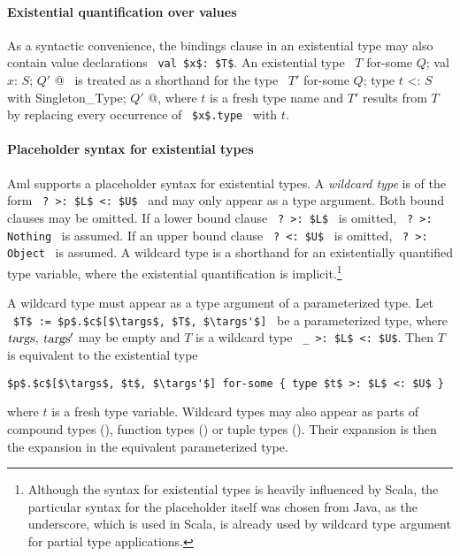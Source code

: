 \paragraph{Existential quantification over values}
As a syntactic convenience, the bindings clause in an existential type may also contain value declarations ~\lstinline!val $x$: $T$!. An existential type ~\lstinline@$T$ for-some { $Q$; val $x$: $S$; $Q'$ }@~ is treated as a shorthand for the type ~\lstinline@$T'$ for-some { $Q$; type $t$ <: $S$ with Singleton_Type; $Q'$ }@, where $t$ is a fresh type name and $T'$ results from $T$ by replacing every occurrence of ~\lstinline!$x$.type!~ with $t$. 



\paragraph{Placeholder syntax for existential types}
\label{par:placeholder-existential-types}
Aml supports a placeholder syntax for existential types. A {\em wildcard type} is of the form ~\lstinline!? >: $L$ <: $U$!~ and may only appear as a type argument. Both bound clauses may be omitted. If a lower bound clause ~\lstinline!? >: $L$!~ is omitted, ~\lstinline!? >: Nothing!~ is assumed. If an upper bound clause ~\lstinline!? <: $U$!~ is omitted, ~\lstinline!? >: Object!~ is assumed. A wildcard type is a shorthand for an existentially quantified type variable, where the existential quantification is implicit.\footnote{Although the syntax for existential types is heavily influenced by Scala, the particular syntax for the placeholder itself was chosen from Java, as the underscore, which is used in Scala, is already used by wildcard type argument for partial type applications.}

A wildcard type must appear as a type argument of a parameterized type. Let ~\lstinline!$T$ := $p$.$c$[$\targs$, $T$, $\targs'$]!~ be a parameterized type, where $\mbox{\sl targs}$, $\mbox{\sl targs}'$ may be empty and $T$ is a wildcard type ~\lstinline!_ >: $L$ <: $U$!. Then $T$ is equivalent to the existential type
\begin{lstlisting}
$p$.$c$[$\targs$, $t$, $\targs'$] for-some { type $t$ >: $L$ <: $U$ }
\end{lstlisting}
where $t$ is a fresh type variable. Wildcard types may also appear as parts of compound types (), function types () or tuple types (). Their expansion is then the expansion in the equivalent parameterized type. 

